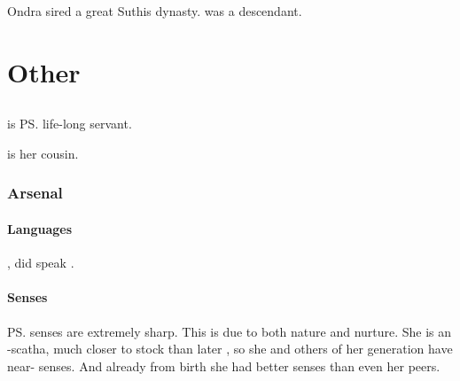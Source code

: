 Ondra sired a great Suthis dynasty. 
 was a descendant. 























\chapter{Other}
\section{\Criseis}
\index{\Criseis}
\Criseis{} is \ps{\Ishnaruchaefir} life-long servant. 

 is her cousin. 









\subsection{Arsenal}





\subsubsection{Languages}
, \Criseis{} did speak \Velcadian. 





\subsubsection{Senses}
\ps{\Criseis} senses are extremely sharp. 
This is due to both nature and nurture. 
She is an \uber-scatha, much closer to \draconic{} stock than later \scathae, so she and others of her generation have near-\draconic{} senses. 
And already from birth she had better senses than even her peers. 


